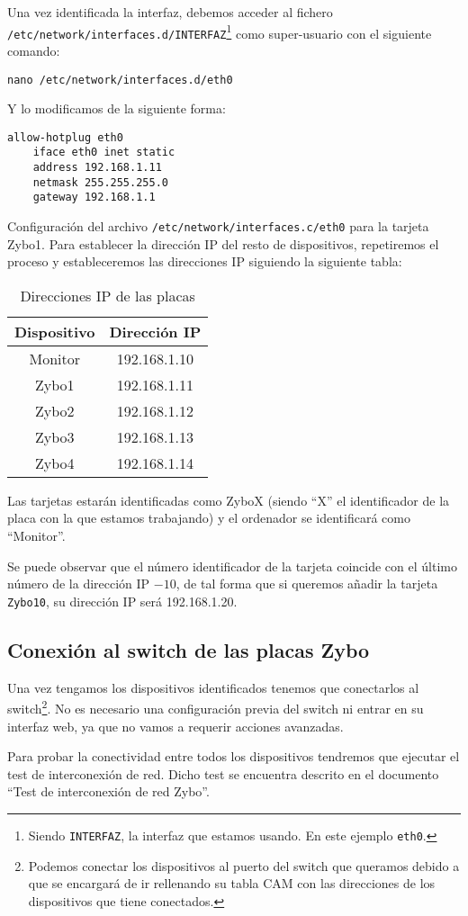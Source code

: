 \documentclass[12pt,letterpaper]{article}
\begin{document}
Una vez identificada la interfaz, debemos acceder al fichero\\ \texttt{/etc/network/interfaces.d/INTERFAZ}\footnote{Siendo \texttt{INTERFAZ}, la interfaz que estamos usando. En este ejemplo \texttt{eth0}.} como super-usuario con el siguiente comando:
\begin{center}
	\texttt{nano /etc/network/interfaces.d/eth0}
\end{center}
Y lo modificamos de la siguiente forma:
\begin{lstlisting}
allow-hotplug eth0
    iface eth0 inet static
    address 192.168.1.11
    netmask 255.255.255.0
    gateway 192.168.1.1
\end{lstlisting}
Configuración del archivo \texttt{/etc/network/interfaces.c/eth0} para la tarjeta Zybo1.
\newpage
Para establecer la dirección IP del resto de dispositivos, repetiremos el proceso y estableceremos las direcciones IP siguiendo la siguiente tabla:
\begin{table}[h]
	\centering
	\begin{tabular}{|c|c|}
		\hline
		\textbf{Dispositivo} & \textbf{Dirección IP} \\ \hline
		Monitor & 192.168.1.10 \\ \hline
		Zybo1 & 192.168.1.11 \\ \hline
		Zybo2 & 192.168.1.12 \\ \hline
		Zybo3 & 192.168.1.13 \\ \hline
		Zybo4 & 192.168.1.14 \\ \hline
	\end{tabular}
\caption{Direcciones IP de las placas}
\label{Direcciones IP de las placas}
\end{table}

Las tarjetas estarán identificadas como ZyboX (siendo ``X'' el identificador de la placa con la que estamos trabajando) y el ordenador se identificará como ``Monitor''.

Se puede observar que el número identificador de la tarjeta coincide con el último número de la dirección IP $- 10$, de tal forma que si queremos añadir la tarjeta \texttt{Zybo10}, su dirección IP será 192.168.1.20.

\subsection{Conexión al switch de las placas Zybo}
Una vez tengamos los dispositivos identificados tenemos que conectarlos al switch\footnote{Podemos conectar los dispositivos al puerto del switch que queramos debido a que se encargará de ir rellenando su tabla CAM con las direcciones de los dispositivos que tiene conectados.}. No es necesario una configuración previa del switch ni entrar en su interfaz web, ya que no vamos a requerir acciones avanzadas.

Para probar la conectividad entre todos los dispositivos tendremos que ejecutar el test de interconexión de red. Dicho test se encuentra descrito en el documento ``Test de interconexión de red Zybo''.
\end{document}
